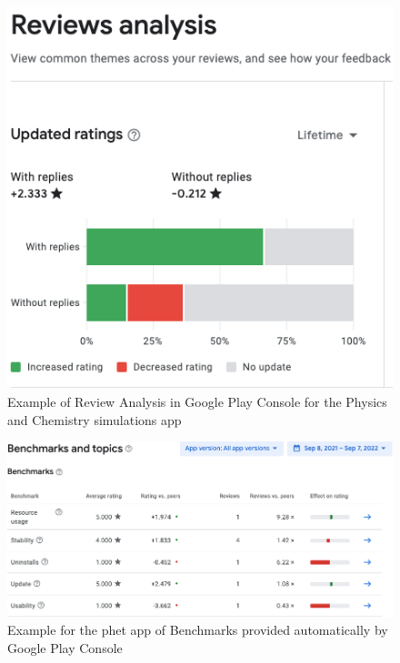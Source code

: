 \begin{figure}
    \centering
    \includegraphics[width=\linewidth]{images/google-play-console/PhET-Review-Analysis-Screenshot-2022-09-07.png}
    \caption{Example of Review Analysis in Google Play Console for the Physics and Chemistry simulations app}
    \label{fig:PhET-Review-Analysis-Screenshot-2022-09-07}
\end{figure}

\begin{figure}
    \centering
    \includegraphics[width=\linewidth]{images/google-play-console/PhET-Review-Benchmarks-Screenshot-2022-09-07.png}
    \caption[Example for the \acrshort{phet} app of Benchmarks provided automatically by Google Play Console]{Example for the \Gls{phet} app of Benchmarks provided automatically by Google Play Console}
    \label{fig:PhET-Review-Benchmarks-Screenshot-2022-09-07}
\end{figure}


